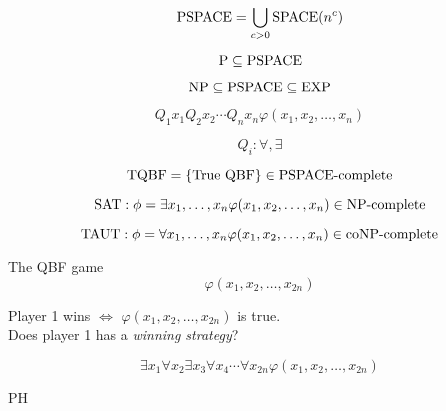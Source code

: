 \begin{frame}{\pspace}
  \[
	\text{PSPACE} = \bigcup_{c > 0} \text{SPACE}(n^c)
  \]

  \[
	\text{P} \subseteq \text{PSPACE}
  \]
  
  \[
	\text{NP} \subseteq \text{PSPACE} \subseteq \text{EXP}
  \]
\end{frame}
\begin{frame}{\pspacec}
  \begin{definition}
	\[
	  Q_1 x_1 Q_2 x_2 \cdots Q_n x_n \varphi(x_1, x_2, \ldots, x_n)
	\]

	\[
	  Q_i: \forall, \exists
	\]
  \end{definition}

  \[
	\text{TQBF} = \{\text{True QBF}\} \in \text{PSPACE-complete}
  \]

  \[
	\text{SAT}: \phi = \exists x_1,\ldots,x_n \varphi(x_1, x_2, \ldots, x_n) \in \text{NP-complete}
  \]

  \[
	\text{TAUT}: \phi = \forall x_1,\ldots,x_n \varphi(x_1, x_2, \ldots, x_n) \in \text{coNP-complete}
  \]
\end{frame}
\begin{frame}{\pspacec}
  \begin{exampleblock}{The QBF game}
	\[
	  \varphi(x_1,x_2,\dots,x_{2n})
	\]

	\begin{center}
	  Player 1 wins $\iff$ $\varphi(x_1,x_2,\dots,x_{2n})$ is true.\\[6pt]
	  Does player 1 has a \emph{winning strategy}?
	\end{center}

	\[
	  \exists x_1 \forall x_2 \exists x_3 \forall x_4 \cdots \forall x_{2n} \varphi(x_1,x_2,\dots,x_{2n})
	\]
  \end{exampleblock}
\end{frame}
\begin{frame}{PH}

\end{frame}
